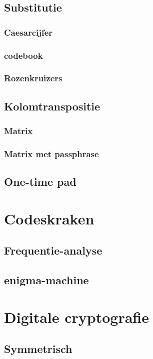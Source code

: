 \documentclass[a4paper,12pt,twoside,openright,titlepage]{book}
\begin{document}
\section{Substitutie}

\subsection{Caesarcijfer}

\subsection{codebook}

\subsection{Rozenkruizers}

\section{Kolomtranspositie}
\subsection{Matrix}

\subsection{Matrix met passphrase}

\section{One-time pad}


\chapter{Codeskraken}
\section{Frequentie-analyse}
\section{enigma-machine}

\chapter{Digitale cryptografie}
\section{Symmetrisch}

\end{document}
